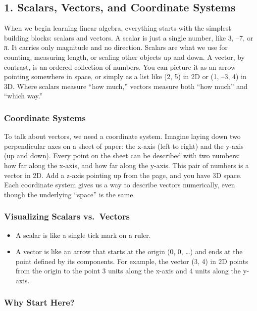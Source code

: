 \documentclass[
  letterpaper,
  DIV=11,
  numbers=noendperiod]{scrreprt}
\providecommand{\tightlist}{%
  \setlength{\itemsep}{0pt}\setlength{\parskip}{0pt}}
\begin{document}
\subsection{1. Scalars, Vectors, and Coordinate
Systems}\label{scalars-vectors-and-coordinate-systems}

When we begin learning linear algebra, everything starts with the
simplest building blocks: scalars and vectors. A scalar is just a single
number, like 3, --7, or π. It carries only magnitude and no direction.
Scalars are what we use for counting, measuring length, or scaling other
objects up and down. A vector, by contrast, is an ordered collection of
numbers. You can picture it as an arrow pointing somewhere in space, or
simply as a list like (2, 5) in 2D or (1, --3, 4) in 3D. Where scalars
measure ``how much,'' vectors measure both ``how much'' and ``which
way.''

\subsubsection{Coordinate Systems}\label{coordinate-systems}

To talk about vectors, we need a coordinate system. Imagine laying down
two perpendicular axes on a sheet of paper: the x-axis (left to right)
and the y-axis (up and down). Every point on the sheet can be described
with two numbers: how far along the x-axis, and how far along the
y-axis. This pair of numbers is a vector in 2D. Add a z-axis pointing up
from the page, and you have 3D space. Each coordinate system gives us a
way to describe vectors numerically, even though the underlying
``space'' is the same.

\subsubsection{Visualizing Scalars
vs.~Vectors}\label{visualizing-scalars-vs.-vectors}

\begin{itemize}
\tightlist
\item
  A scalar is like a single tick mark on a ruler.
\item
  A vector is like an arrow that starts at the origin (0, 0, \ldots) and
  ends at the point defined by its components. For example, the vector
  (3, 4) in 2D points from the origin to the point 3 units along the
  x-axis and 4 units along the y-axis.
\end{itemize}

\subsubsection{Why Start Here?}\label{why-start-here}
\end{document}
